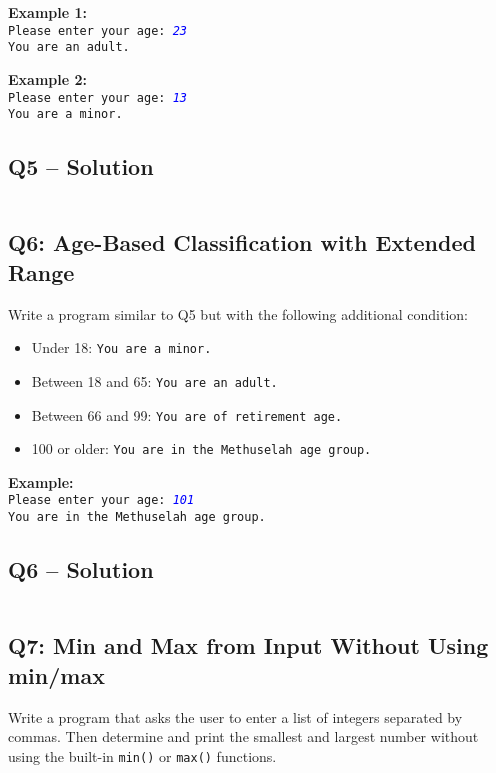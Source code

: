 \documentclass[a4paper,11pt]{article}
\begin{document}
	\textbf{Example 1:}\\
	\texttt{Please enter your age: \textcolor{blue}{\textit{23}}}\\
	\texttt{You are an adult.}
	
	\textbf{Example 2:}\\
	\texttt{Please enter your age: \textcolor{blue}{\textit{13}}}\\
	\texttt{You are a minor.}
	
		
	\subsection*{Q5 – Solution}
		\inputminted{python}{Files/1/5.py}
	
	\subsection*{Q6: Age-Based Classification with Extended Range}
	Write a program similar to Q5 but with the following additional condition:
	
	\begin{itemize}
		\item Under 18: \texttt{You are a minor.}
		\item Between 18 and 65: \texttt{You are an adult.}
		\item Between 66 and 99: \texttt{You are of retirement age.}
		\item 100 or older: \texttt{You are in the Methuselah age group.}
	\end{itemize}
	
	\textbf{Example:}\\
	\texttt{Please enter your age: \textcolor{blue}{\textit{101}}}\\
	\texttt{You are in the Methuselah age group.}
	
		
	\subsection*{Q6 – Solution}
		\inputminted{python}{Files/1/6.py}
	
	\subsection*{Q7: Min and Max from Input Without Using min/max}
	Write a program that asks the user to enter a list of integers separated by commas. Then determine and print the smallest and largest number without using the built-in \texttt{min()} or \texttt{max()} functions.
	
\end{document}
